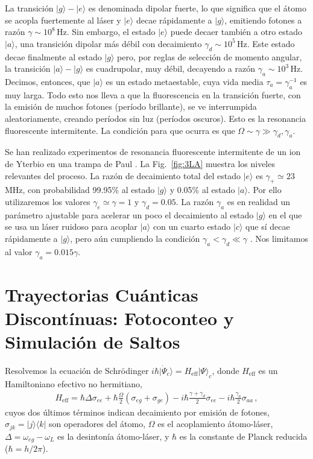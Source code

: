 \documentclass[superscriptaddress,12pt,amsmath]{revtex4-2}
\providecommand{\ket}[1]{\lvert #1 \rangle}
\begin{document}
La transici\'on $|g\rangle - |e\rangle$ es denominada dipolar fuerte, lo 
que significa que el \'atomo se acopla fuertemente al l\'aser y $|e\rangle$ 
decae r\'apidamente a $|g\rangle$, emitiendo fotones a raz\'on 
$\gamma \sim 10^8 \,\mathrm{Hz}$. Sin embargo, el estado $|e\rangle$ 
puede decaer tambi\'en a otro estado $|a\rangle$, una transici\'on dipolar 
m\'as d\'ebil con decaimiento $\gamma_d \sim 10^{5} \,\mathrm{Hz}$. 
Este estado decae finalmente al estado $|g\rangle$ pero, por reglas de 
selecci\'on de momento angular, la transici\'on $|a\rangle -|g\rangle$ es 
cuadrupolar, muy d\'ebil, decayendo a raz\'on 
$\gamma_a \sim 10^{3} \,\mathrm{Hz}$. Decimos, entonces, que 
$|a\rangle$ es un estado metaestable, cuya vida media 
$\tau_a =\gamma_a^{-1}$ es muy larga. Todo esto nos lleva a que la 
fluorescencia en la transici\'on fuerte, con la emisi\'on de muchos fotones 
(per\'iodo brillante), se ve interrumpida aleatoriamente, creando per\'iodos 
sin luz (per\'iodos oscuros). Esto es la resonancia fluorescente 
intermitente. La condici\'on para que ocurra es que 
$\Omega \sim \gamma \gg \gamma_d, \gamma_a$. 
 
Se han realizado experimentos de resonancia fluorescente  intermitente de 
un ion de Yterbio en una trampa de Paul \cite{BuTa00}. La Fig.~\ref{fig:3LA} 
muestra los niveles relevantes del proceso. La raz\'on de decaimiento total 
del estado $|e\rangle$ es $\gamma_+ \simeq 23$ MHz, con probabilidad 
99.95\% al estado $|g\rangle$ y 0.05\% al estado $|a\rangle$. Por ello 
utilizaremos los valores $\gamma_e \simeq \gamma =1$ y 
$\gamma_d =0.05$. La raz\'on $\gamma_a$ es en realidad un par\'ametro 
ajustable para acelerar un poco el decaimiento al estado  $|g\rangle$ en 
el que se usa un l\'aser ruidoso para acoplar $|a\rangle$ con un cuarto 
estado $|c\rangle$ que s\'i decae r\'apidamente a $|g\rangle$, pero a\'un 
cumpliendo la condici\'on $\gamma_a < \gamma_d \ll \gamma$ 
\cite{BuTa00}. Nos limitamos al valor $\gamma_a = 0.015 \gamma$.
 
\section{Trayectorias Cu\'anticas Discont\'inuas: Fotoconteo y 
Simulaci\'on de Saltos}
Resolvemos la ecuaci\'on de Schr\"odinger 
$i \hbar \ket{\dot{\Psi}_c} = H_{\mathrm{eff}} \ket{\Psi}_c$, donde 
$H_{\mathrm{eff}}$ es un Hamiltoniano efectivo no hermitiano,  
%
\begin{eqnarray}
H_{\mathrm{eff}} = \hbar \Delta \sigma_{ee} 
	+ \hbar \frac{\Omega}{2}(\sigma_{eg}  +\sigma_{ge}) 
 	-i \hbar \frac{\gamma+\gamma_d}{2} \sigma_{ee} 
	 -i \hbar \frac{\gamma_a}{2} \sigma_{aa} \,, 
\end{eqnarray}
cuyos dos \'ultimos t\'erminos indican decaimiento por emisi\'on de fotones, 
$\sigma_{jk} = |j\rangle \langle k|$ son operadores del \'atomo, $\Omega$ 
es el acoplamiento \'atomo-l\'aser,  $\Delta= \omega_{eg} -\omega_L$ es la 
desinton\'ia \'atomo-l\'aser, y $\hbar$ es la constante de Planck reducida 
($\hbar=h/2\pi$). 
\end{document}
